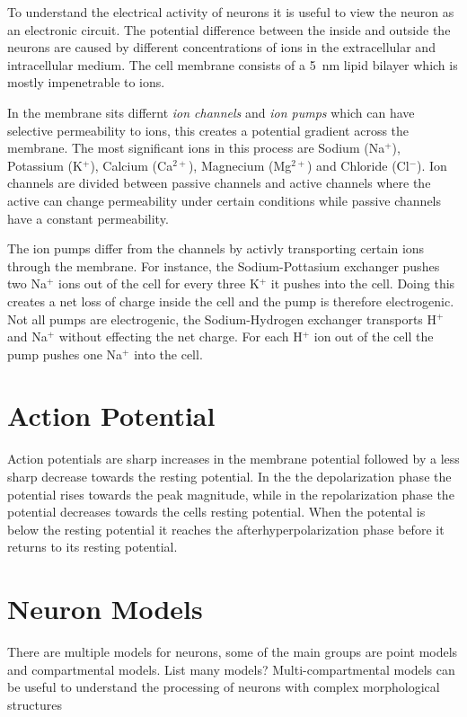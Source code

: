 \documentclass[altfont, fleqn]{uiophd}
\begin{document}
To understand the electrical activity of neurons it is useful
to view the neuron as an electronic circuit.
The potential difference between the inside and outside the neurons 
are caused by different concentrations of 
ions
in the extracellular and intracellular medium. The cell membrane
consists of a \SI{5}{\nano\metre} lipid bilayer which is mostly impenetrable 
to ions. 


In the membrane sits differnt \emph{ion channels} and 
\emph{ion pumps} which can have selective permeability to ions, this creates 
a potential gradient across the membrane. 
The most significant ions in this process are Sodium (Na$^+$), Potassium (K$^+$), 
Calcium (Ca$^{2+}$), Magnecium (Mg$^{2+}$) and Chloride (Cl$^{-}$). 
Ion channels are divided between passive channels and 
active channels where the active can change 
permeability under certain conditions while passive channels have a constant
permeability. 

The ion pumps differ from the channels by activly transporting certain
ions through the membrane. 
For instance, the Sodium-Pottasium exchanger pushes two Na$^+$ ions out of the cell
for every three K$^+$ it pushes into the cell. Doing this creates a net 
loss of charge inside the cell and the pump is therefore electrogenic. 
Not all pumps are electrogenic, the Sodium-Hydrogen exchanger transports
H$^+$ and Na$^+$ without effecting the net charge.
For each H$^+$ ion out of the cell the pump pushes one Na$^+$
into the cell. 


\textcites{hodgkin_quantitative_1952,connor_prediction_1971,sterratt_principles_2011}


\section{Action Potential}
Action potentials are sharp increases in the membrane potential
followed by a less sharp decrease towards the resting potential. 
In the the depolarization phase the potential rises towards the peak magnitude, 
while in the repolarization phase the potential decreases towards
the cells resting potential.
When the potental is below the resting potential 
it reaches the afterhyperpolarization phase before
it returns to its resting potential.

\section{Neuron Models}
There are multiple models for neurons, some of the main groups are 
point models and compartmental models. List many models?
Multi-compartmental models 
can be useful to understand the processing of neurons with
complex morphological structures
\end{document}
